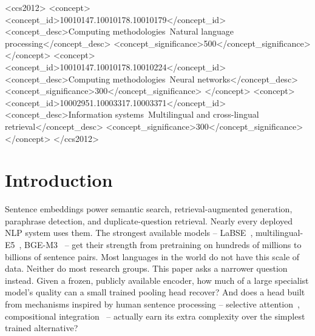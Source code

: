 \documentclass[manuscript]{acmart}
\begin{document}
\begin{CCSXML}
<ccs2012>
<concept>
<concept_id>10010147.10010178.10010179</concept_id>
<concept_desc>Computing methodologies~Natural language processing</concept_desc>
<concept_significance>500</concept_significance>
</concept>
<concept>
<concept_id>10010147.10010178.10010224</concept_id>
<concept_desc>Computing methodologies~Neural networks</concept_desc>
<concept_significance>300</concept_significance>
</concept>
<concept>
<concept_id>10002951.10003317.10003371</concept_id>
<concept_desc>Information systems~Multilingual and cross-lingual retrieval</concept_desc>
<concept_significance>300</concept_significance>
</concept>
</ccs2012>
\end{CCSXML}



\maketitle

\section{Introduction}
\label{sec:intro}

Sentence embeddings power semantic search, retrieval-augmented generation, paraphrase detection, and duplicate-question retrieval. Nearly every deployed NLP system uses them. The strongest available models -- LaBSE~\citep{feng2020labse}, multilingual-E5~\citep{wang2024me5}, BGE-M3~\citep{chen2024bgem3} -- get their strength from pretraining on hundreds of millions to billions of sentence pairs. Most languages in the world do not have this scale of data. Neither do most research groups. This paper asks a narrower question instead. Given a frozen, publicly available encoder, how much of a large specialist model's quality can a small trained pooling head recover? And does a head built from mechanisms inspired by human sentence processing -- selective attention~\citep{broadbent1958perception}, compositional integration~\citep{jackendoff2002foundations} -- actually earn its extra complexity over the simplest trained alternative?
\end{document}
